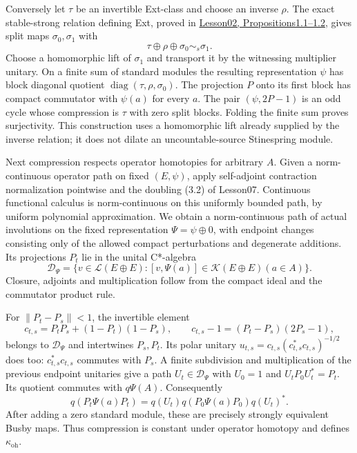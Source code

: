 \documentclass[
  11pt,
]{article}
\begin{document}
Conversely let \(\tau\) be an invertible Ext-class and choose an inverse
\(\rho\). The exact stable-strong relation defining Ext, proved in
\href{KT-KK-02.html\#proposition-1-2-the-stabilized-semigroup-has-zero}{Lesson02,
Propositions1.1--1.2}, gives split maps \(\sigma_0,\sigma_1\) with \[
\tau\oplus\rho\oplus\sigma_0\sim_s\sigma_1.
\tag{B.E.3}
\] Choose a homomorphic lift of \(\sigma_1\) and transport it by the
witnessing multiplier unitary. On a finite sum of standard modules the
resulting representation \(\psi\) has block diagonal quotient
\(\operatorname{diag}(\tau,\rho,\sigma_0)\). The projection \(P\) onto
its first block has compact commutator with \(\psi(a)\) for every \(a\).
The pair \((\psi,2P-1)\) is an odd cycle whose compression is \(\tau\)
with zero split blocks. Folding the finite sum proves surjectivity. This
construction uses a homomorphic lift already supplied by the inverse
relation; it does not dilate an uncountable-source Stinespring module.

Next compression respects operator homotopies for arbitrary \(A\). Given
a norm-continuous operator path on fixed \((E,\psi)\), apply
self-adjoint contraction normalization pointwise and the doubling (3.2)
of Lesson07. Continuous functional calculus is norm-continuous on this
uniformly bounded path, by uniform polynomial approximation. We obtain a
norm-continuous path of actual involutions on the fixed representation
\(\Psi=\psi\oplus0\), with endpoint changes consisting only of the
allowed compact perturbations and degenerate additions. Its projections
\(P_t\) lie in the unital C*-algebra \[
\mathcal D_\Psi=\{v\in\mathcal L(E\oplus E):[v,\Psi(a)]\in\mathcal K(E\oplus E) (a\in A)\}.
\tag{B.E.4}
\] Closure, adjoints and multiplication follow from the compact ideal
and the commutator product rule.

For \(\|P_t-P_s\|<1\), the invertible element \[
c_{t,s}=P_tP_s+(1-P_t)(1-P_s),\qquad
c_{t,s}-1=(P_t-P_s)(2P_s-1),
\tag{B.E.5}
\] belongs to \(\mathcal D_\Psi\) and intertwines \(P_s,P_t\). Its polar
unitary \(u_{t,s}=c_{t,s}(c_{t,s}^*c_{t,s})^{-1/2}\) does too:
\(c_{t,s}^*c_{t,s}\) commutes with \(P_s\). A finite subdivision and
multiplication of the previous endpoint unitaries give a path
\(U_t\in\mathcal D_\Psi\) with \(U_0=1\) and \(U_tP_0U_t^*=P_t\). Its
quotient commutes with \(q\Psi(A)\). Consequently \[
q(P_t\Psi(a)P_t)=q(U_t)q(P_0\Psi(a)P_0)q(U_t)^*.
\tag{B.E.6}
\] After adding a zero standard module, these are precisely strongly
equivalent Busby maps. Thus compression is constant under operator
homotopy and defines \(\kappa_{\mathrm{oh}}\).
\end{document}
